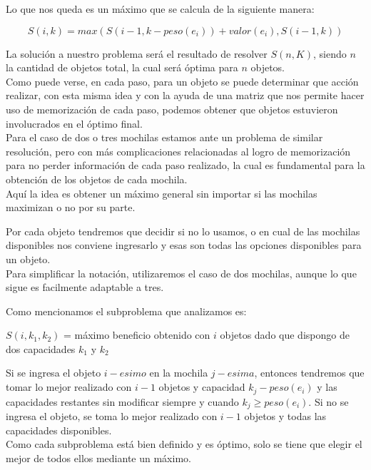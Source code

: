 Lo que nos queda es un máximo que se calcula de la siguiente manera:

\begin{equation}
S(i, k) = max(S(i-1, k-peso(e_i))+valor(e_i), S(i-1, k))
\end{equation}

La solución a nuestro problema será el resultado de resolver $S(n, K)$, siendo $n$ la cantidad de objetos total, la cual será óptima para $n$ objetos.\\

Como puede verse, en cada paso, para un objeto se puede determinar que acción realizar, con esta misma idea y con la ayuda de una matriz que nos permite hacer uso de memorizaci\'on de cada paso, podemos obtener que objetos estuvieron involucrados en el \'optimo final.\\

Para el caso de dos o tres mochilas estamos ante un problema de similar resolución, pero con más complicaciones relacionadas al logro de memorización para no perder información de cada paso realizado, la cual es fundamental para la obtención de los objetos de cada mochila.\\

Aquí la idea es obtener un máximo general sin importar si las mochilas maximizan o no por su parte.

Por cada objeto tendremos que decidir si no lo usamos, o en cual de las mochilas disponibles nos conviene ingresarlo y esas son todas las opciones disponibles para un objeto.\\
Para simplificar la notación, utilizaremos el caso de dos mochilas, aunque lo que sigue es facilmente adaptable a tres.

Como mencionamos el subproblema que analizamos es:

\begin{center}
$S(i, k_1, k_2)$ = máximo beneficio obtenido con $i$ objetos dado que dispongo de dos capacidades $k_1$ y $k_2$
\end{center}

Si se ingresa el objeto $i-esimo$ en la mochila $j-esima$, entonces tendremos que tomar lo mejor realizado con $i-1$ objetos y capacidad $k_j-peso(e_i)$ y las capacidades restantes sin modificar siempre y cuando $k_j \geq peso(e_i)$.
Si no se ingresa el objeto, se toma lo mejor realizado con $i-1$ objetos y todas las capacidades disponibles.\\

Como cada subproblema está bien definido y es óptimo, solo se tiene que elegir el mejor de todos ellos mediante un máximo. 

